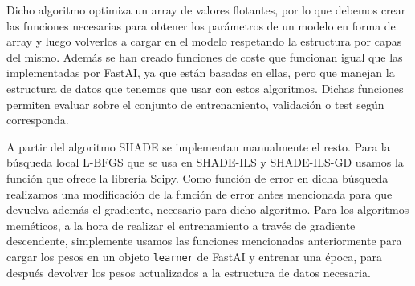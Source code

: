 Dicho algoritmo optimiza un array de valores flotantes, por lo que debemos crear las funciones necesarias para obtener los parámetros de un modelo en forma de array y luego volverlos a cargar en el modelo respetando la estructura por capas del mismo. Además se han creado funciones de coste que funcionan igual que las implementadas por FastAI, ya que están basadas en ellas, pero que manejan la estructura de datos que tenemos que usar con estos algoritmos. Dichas funciones permiten evaluar sobre el conjunto de entrenamiento, validación o test según corresponda. 

A partir del algoritmo SHADE se implementan manualmente el resto. Para la búsqueda local L-BFGS que se usa en SHADE-ILS y SHADE-ILS-GD usamos la función que ofrece la librería Scipy. Como función de error en dicha búsqueda realizamos una modificación de la función de error antes mencionada para que devuelva además el gradiente, necesario para dicho algoritmo. Para los algoritmos meméticos, a la hora de realizar el entrenamiento a través de gradiente descendente, simplemente usamos las funciones mencionadas anteriormente para cargar los pesos en un objeto \verb|learner| de FastAI y entrenar una época, para después devolver los pesos actualizados a la estructura de datos necesaria.

